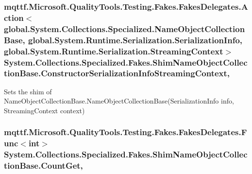 \hypertarget{class_system_1_1_collections_1_1_specialized_1_1_fakes_1_1_shim_name_object_collection_base_a3dabf1a7d5300ff2a775e0629b86f3d7}{
\subsubsection[{Constructor\-Serialization\-Info\-Streaming\-Context}]{\setlength{\rightskip}{0pt plus 5cm}mqttf.\-Microsoft.\-Quality\-Tools.\-Testing.\-Fakes.\-Fakes\-Delegates.\-Action$<$global.\-System.\-Collections.\-Specialized.\-Name\-Object\-Collection\-Base, global.\-System.\-Runtime.\-Serialization.\-Serialization\-Info, global.\-System.\-Runtime.\-Serialization.\-Streaming\-Context$>$ System.\-Collections.\-Specialized.\-Fakes.\-Shim\-Name\-Object\-Collection\-Base.\-Constructor\-Serialization\-Info\-Streaming\-Context\hspace{0.3cm}{\ttfamily [static]}, {\ttfamily [set]}}}\label{class_system_1_1_collections_1_1_specialized_1_1_fakes_1_1_shim_name_object_collection_base_a3dabf1a7d5300ff2a775e0629b86f3d7}


Sets the shim of Name\-Object\-Collection\-Base.\-Name\-Object\-Collection\-Base(\-Serialization\-Info info, Streaming\-Context context)

\hypertarget{class_system_1_1_collections_1_1_specialized_1_1_fakes_1_1_shim_name_object_collection_base_ad32c596db5b346e190816c561a309111}{
\subsubsection[{Count\-Get}]{\setlength{\rightskip}{0pt plus 5cm}mqttf.\-Microsoft.\-Quality\-Tools.\-Testing.\-Fakes.\-Fakes\-Delegates.\-Func$<$int$>$ System.\-Collections.\-Specialized.\-Fakes.\-Shim\-Name\-Object\-Collection\-Base.\-Count\-Get\hspace{0.3cm}{\ttfamily [get]}, {\ttfamily [set]}}}\label{class_system_1_1_collections_1_1_specialized_1_1_fakes_1_1_shim_name_object_collection_base_ad32c596db5b346e190816c561a309111}



